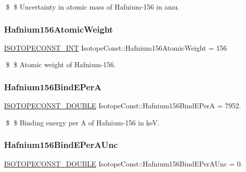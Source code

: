 \$ \$ Uncertainty in atomic mass of Hafnium-\/156 in amu. \mbox{\label{group___isotope_const-_hafnium-_hf156_ga7843b2ddef5f94e0613e98ee132fccab}} 
\subsubsection{\texorpdfstring{Hafnium156\+Atomic\+Weight}{Hafnium156AtomicWeight}}
{\footnotesize\ttfamily \mbox{\hyperlink{group___isotope_const-_macros_ga5f18360b3e99483a35c32d789e62621c}{I\+S\+O\+T\+O\+P\+E\+C\+O\+N\+S\+T\+\_\+\+I\+NT}} Isotope\+Const\+::\+Hafnium156\+Atomic\+Weight = 156}

\$ \$ Atomic weight of Hafnium-\/156. \mbox{\label{group___isotope_const-_hafnium-_hf156_ga0579899888c1aa5cf88d46f23c2d3603}} 
\subsubsection{\texorpdfstring{Hafnium156\+Bind\+E\+PerA}{Hafnium156BindEPerA}}
{\footnotesize\ttfamily \mbox{\hyperlink{group___isotope_const-_macros_ga8f45a7272ce02c0b4c65c44636ed719a}{I\+S\+O\+T\+O\+P\+E\+C\+O\+N\+S\+T\+\_\+\+D\+O\+U\+B\+LE}} Isotope\+Const\+::\+Hafnium156\+Bind\+E\+PerA = 7952.}

\$ \$ Binding energy per A of Hafnium-\/156 in keV. \mbox{\label{group___isotope_const-_hafnium-_hf156_ga59bc47c1857d6c9f961d9fd6d5e2113b}} 
\subsubsection{\texorpdfstring{Hafnium156\+Bind\+E\+Per\+A\+Unc}{Hafnium156BindEPerAUnc}}
{\footnotesize\ttfamily \mbox{\hyperlink{group___isotope_const-_macros_ga8f45a7272ce02c0b4c65c44636ed719a}{I\+S\+O\+T\+O\+P\+E\+C\+O\+N\+S\+T\+\_\+\+D\+O\+U\+B\+LE}} Isotope\+Const\+::\+Hafnium156\+Bind\+E\+Per\+A\+Unc = 0.}


